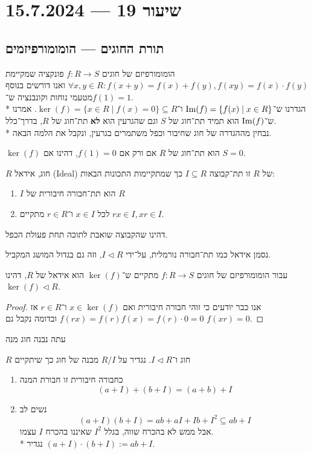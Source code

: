 \section{שיעור 19 --- 15.7.2024}
\subsection{תורת החוגים --- הומומורפיזמים}
הומומורפיזם של חוגים $f : R \to S$ פונקציה שמקיימת $\forall x, y \in R : f(x + y) = f(x) + f(y), f(xy) = f(x) \cdot f(y)$ ואנו דורשים בנוסף מטעמי נוחות וקונבנציה ש־$f(1) = 1$. \\*
הגדרנו ש־$\operatorname{Im}(f) = \{ f(x) \mid x \in R \}$ ו־$\ker(f) = \{ x \in R \mid f(x) = 0 \} \subseteq R$.
אמרנו ש־$\operatorname{Im}(f)$ הוא תמיד תת־חוג של $S$ וגם שהגרעין הוא \textbf{לא} תת־חוג של $R$, בדרך־כלל. \\*
נבחין מההגדרה של חוג שחיבור וכפל משתמרים בגרעין, ונקבל את הלמה הבאה.
\begin{lemma}
	$\ker(f)$ הוא תת־חוג של $R$ אם ורק אם $f(1) = 0$, דהינו אם $S = 0$.
\end{lemma}
\begin{definition}[אידאל]
	$R$ חוג, אידאל (Ideal) של $R$ זו תת־קבוצה $I \subseteq R$ כך שמתקיימות התכונות הבאות:
	\begin{enumerate}
		\item $I$ הוא תת־חבורה חיבורית של $R$
		\item לכל $x \in I$ ו־$r \in R$ מתקיים $rx \in I, xr \in I$.
	\end{enumerate}
	דהינו שהקבוצה שואבת לתוכה תחת פעולת הכפל.
\end{definition}
\begin{notation}
	נסמן אידאל כמו תת־חבורה נורמלית, על־ידי $I \triangleleft R$, וזה גם בגדול המושג המקביל.
\end{notation}
\begin{lemma}
	עבור הומומורפיזם של חוגים $f : R \to S$ מתקיים ש־$\ker(f)$ הוא אידאל של $R$, דהינו $\ker(f) \triangleleft R$.
\end{lemma}
\begin{proof}
	אנו כבר יודעים כי זוהי חבורה חיבורית ואם $x \in \ker(f)$ ו־$r \in R$ אז $f(rx) = f(r)f(x) = f(r) \cdot 0 = 0$ ובדומה נקבל גם $f(xr) = 0$.
\end{proof}
עתה נבנה חוג מנה
\begin{definition}
	$R$ חוג ו־$I \triangleleft R$. נגדיר על $R/I$ מבנה של חוג כך שיתקיים
	\begin{enumerate}
		\item כחבורה חיבורית זו חבורת המנה
			\[
				(a + I) + (b + I) = (a + b) + I
			\]
		\item נשים לב
			\[
				(a + I)(b + I) = ab + aI + Ib + I^2 \subseteq ab + I
			\]
			אבל ממש לא בהכרח שווה, בגלל $I^2$ שאיננו בהכרח $I$ עצמו. \\*
			נגדיר $(a + I) \cdot (b + I) := ab + I$.
	\end{enumerate}
\end{definition}
